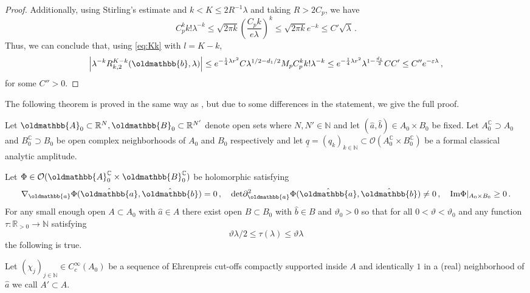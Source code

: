 \documentclass[
	fontsize=11pt, 
	twoside=false, 
	abstract=true, 
	a4paper,
]{scrartcl}
\newcommand{\eps}{\varepsilon}
\newcommand{\RR}{\mathbb{R}}
\newcommand{\CC}{\mathbb{C}}
\newcommand{\abs}[1]{\left\lvert#1\right\rvert}
\newcommand{\del}{\partial}
\newcommand{\ud}[1]{\underline{#1}}
\newcommand{\mf}[1]{\oldmathbb{#1}}
\begin{document}
\begin{proof}
	Additionally, using Stirling's estimate and $k<K\leq 2R^{-1}\lambda$ and taking $R > 2C_p$, we have 
	\[
		C_p^k k! \lambda^{-k} \leq \sqrt{2\pi k}\left(\frac{C_p k}{e\lambda}\right)^k \leq \sqrt{2\pi k} e^{-k} \leq C' \sqrt{\lambda}\,.
	\]
	Thus, we can conclude that, using \cref{eq:Kk} with $l = K-k$,
	\[
		\abs{\lambda^{-k}R_{k,2}^{K-k}(\mf{b},\lambda)} \leq e^{-\frac{1}{4}\lambda r^2} C\lambda^{1/2-d_1/2}M_p C_p^k k! \lambda^{-k} \leq e^{-\frac{1}{4}\lambda r^2} \lambda^{1-\frac{d_1}{2}} CC' \leq C'' e^{-\eps\lambda}\,,
	\]
	for some $C'' > 0$.
\end{proof}

The following theorem is proved in the same way as \cite[Prop.~1.4]{zbMATH03717772}, but due to some differences in the statement, we give the full proof.
\begin{theorem}\label{thm:statphase}
	Let $\mf{A}_0 \subset \RR^N, \mf{B}_0 \subset \RR^{N'}$ denote open sets where $N,N'\in\mathbb{N}$ and let $(\hat a,\hat b)\in A_0\times B_0$ be fixed. Let $A_0^\CC \supset A_0$ and $B_0^\CC\supset B_0$ be open complex neighborhoods of $A_0$ and $B_0$ respectively and let $\ud{q} =  (q_k)_{k\in\mathbb{N}} \subset \mathcal{O}(A_0^\CC\times B_0^\CC)$ be a formal classical analytic amplitude.

	Let $\Phi \in\mathcal{O}(\mf{A}_0^\CC\times \mf{B}_0^\CC)$ be holomorphic satisfying
	\begin{equation}\label{eq:phiprops}
		\nabla_{\mf{a}}\Phi(\hat{\mf{a}}, \hat{\mf{b}}) = 0\,,\quad \mathrm{det}\del_{\mf{a}}^2 \Phi(\hat{\mf{a}},\hat{\mf{b}}) \neq 0\,,\quad \mathrm{Im}\Phi\vert_{A_0\times B_0}\geq 0\,.%
	\end{equation}
	For any small enough open $A\subset A_0$ with $\hat a\in A$ there exist open $B\subset B_0$ with $\hat b\in B$ and $\vartheta_0 > 0$ so that for all $0<\vartheta<\vartheta_0$ and any function $\tau \colon \RR_{>0} \to \mathbb{N}$ satisfying
	\[
		\vartheta \lambda/2 \leq \tau(\lambda) \leq \vartheta\lambda
	\]
	the following is true.

	Let $(\chi_j)_{j\in\mathbb{N}} \in C_c^\infty(A_0)$ be a sequence of Ehrenpreis cut-offs compactly supported inside $A$ and identically $1$ in a (real) neighborhood of $\hat a$ we call $A' \subset A$. 



\end{theorem}
\end{document}
